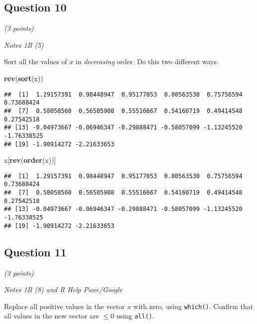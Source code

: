 \documentclass[
]{article}
\newenvironment{Shaded}{\begin{snugshade}}{\end{snugshade}}
\newcommand{\KeywordTok}[1]{\textcolor[rgb]{0.13,0.29,0.53}{\textbf{#1}}}
\newcommand{\NormalTok}[1]{#1}
\begin{document}
\hypertarget{question-10}{%
\subsection{Question 10}\label{question-10}}

\emph{(3 points)}

\emph{Notes 1B (5)}

Sort all the values of \(x\) in \emph{decreasing} order. Do this two
different ways.

\begin{Shaded}
\begin{Highlighting}[]
\KeywordTok{rev}\NormalTok{(}\KeywordTok{sort}\NormalTok{(x))}
\end{Highlighting}
\end{Shaded}

\begin{verbatim}
##  [1]  1.29157391  0.98448947  0.95177053  0.80563530  0.75756594  0.73688424
##  [7]  0.58058560  0.56505908  0.55516667  0.54160719  0.49414548  0.27542518
## [13] -0.04973667 -0.06946347 -0.29888471 -0.58057099 -1.13245520 -1.76338525
## [19] -1.90914272 -2.21633653
\end{verbatim}

\begin{Shaded}
\begin{Highlighting}[]
\NormalTok{x[}\KeywordTok{rev}\NormalTok{(}\KeywordTok{order}\NormalTok{(x))]}
\end{Highlighting}
\end{Shaded}

\begin{verbatim}
##  [1]  1.29157391  0.98448947  0.95177053  0.80563530  0.75756594  0.73688424
##  [7]  0.58058560  0.56505908  0.55516667  0.54160719  0.49414548  0.27542518
## [13] -0.04973667 -0.06946347 -0.29888471 -0.58057099 -1.13245520 -1.76338525
## [19] -1.90914272 -2.21633653
\end{verbatim}

\hypertarget{question-11}{%
\subsection{Question 11}\label{question-11}}

\emph{(3 points)}

\emph{Notes 1B (8) and R Help Pane/Google}

Replace all positive values in the vector \(x\) with zero, using
\texttt{which()}. Confirm that all values in the new vector are
\(\leq 0\) using \texttt{all()}.
\end{document}
